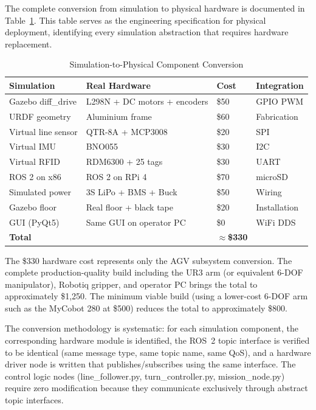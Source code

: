 \documentclass[12pt,a4paper,oneside]{report}
\begin{document}
The complete conversion from simulation to physical hardware is documented in Table~\ref{tab:conversion}. This table serves as the engineering specification for physical deployment, identifying every simulation abstraction that requires hardware replacement.

\begin{table}[H]
\centering
\caption{Simulation-to-Physical Component Conversion}
\label{tab:conversion}
\begin{tabular}{p{3.5cm} p{4cm} p{1.5cm} p{3cm}}
\toprule
\textbf{Simulation} & \textbf{Real Hardware} & \textbf{Cost} & \textbf{Integration} \\
\midrule
Gazebo diff\_drive & L298N + DC motors + encoders & \$50 & GPIO PWM \\
URDF geometry & Aluminium frame & \$60 & Fabrication \\
Virtual line sensor & QTR-8A + MCP3008 & \$20 & SPI \\
Virtual IMU & BNO055 & \$30 & I2C \\
Virtual RFID & RDM6300 + 25 tags & \$30 & UART \\
ROS 2 on x86 & ROS 2 on RPi 4 & \$70 & microSD \\
Simulated power & 3S LiPo + BMS + Buck & \$50 & Wiring \\
Gazebo floor & Real floor + black tape & \$20 & Installation \\
GUI (PyQt5) & Same GUI on operator PC & \$0 & WiFi DDS \\
\midrule
\textbf{Total} & & $\approx$\textbf{\$330} & \\
\bottomrule
\end{tabular}
\end{table}

The \$330 hardware cost represents only the AGV subsystem conversion. The complete production-quality build including the UR3 arm (or equivalent 6-DOF manipulator), Robotiq gripper, and operator PC brings the total to approximately \$1,250. The minimum viable build (using a lower-cost 6-DOF arm such as the MyCobot 280 at \$500) reduces the total to approximately \$800.

The conversion methodology is systematic: for each simulation component, the corresponding hardware module is identified, the ROS~2 topic interface is verified to be identical (same message type, same topic name, same QoS), and a hardware driver node is written that publishes/subscribes using the same interface. The control logic nodes (line\_follower.py, turn\_controller.py, mission\_node.py) require zero modification because they communicate exclusively through abstract topic interfaces.
\end{document}
